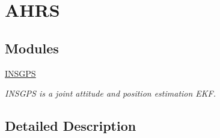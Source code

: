 \hypertarget{group___a_h_r_s}{\section{A\-H\-R\-S}
\label{group___a_h_r_s}
}
\subsection*{Modules}
\begin{DoxyCompactItemize}
\item 
\hyperlink{group___i_n_s_g_p_s}{I\-N\-S\-G\-P\-S}
\begin{DoxyCompactList}\small\item\em I\-N\-S\-G\-P\-S is a joint attitude and position estimation E\-K\-F. \end{DoxyCompactList}\end{DoxyCompactItemize}


\subsection{Detailed Description}
